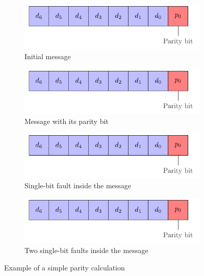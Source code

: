 \begin{figure}[ht]
    \centering
    \begin{subfigure}[b]{0.49\textwidth}
        \includegraphics[width=\textwidth, page=2]{c5_countermeasures_dift/img/simple_parity.pdf}
        \caption{Initial message}
        \label{fig:simpleparity_example_1}
    \end{subfigure}
    \hfill
    \begin{subfigure}[b]{0.49\textwidth}
        \includegraphics[width=\textwidth, page=3]{c5_countermeasures_dift/img/simple_parity.pdf}
        \caption{Message with its parity bit}
        \label{fig:simpleparity_example_2}
    \end{subfigure}
    \hfill
    \begin{subfigure}[b]{0.49\textwidth}
        \includegraphics[width=\textwidth, page=4]{c5_countermeasures_dift/img/simple_parity.pdf}
        \caption{Single-bit fault inside the message}
        \label{fig:simpleparity_faulted_example_3}
    \end{subfigure}
    \hfill
    \begin{subfigure}[b]{0.49\textwidth}
        \includegraphics[width=\textwidth, page=5]{c5_countermeasures_dift/img/simple_parity.pdf}
        \caption{Two single-bit faults inside the message}
        \label{fig:simpleparity_faulted_example_4}
    \end{subfigure}
    \caption{Example of a simple parity calculation}
    \label{fig:simpleparity_example}
\end{figure}

